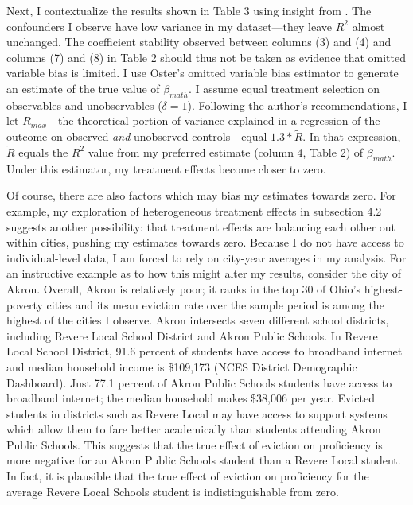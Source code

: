 \documentclass[12pt]{article}
\begin{document}
Next, I contextualize the results shown in Table 3 using insight from \cite{oster_unobservable_2019}. The confounders I observe have low variance in my dataset—they leave $R^2$ almost unchanged. The coefficient stability observed between columns (3) and (4) and columns (7) and (8) in Table 2 should thus not be taken as evidence that omitted variable bias is limited. I use Oster's omitted variable bias estimator to generate an estimate of the true value of $\beta_{math}$. I assume equal treatment selection on observables and unobservables ($\delta = 1$). Following the author's recommendations, I let $R_{max}$—the theoretical portion of  variance explained in a regression of the outcome on observed \textit{and} unobserved controls—equal $1.3 * \tilde{R}$. In that expression, $\tilde{R}$ equals the $R^2$ value from my preferred estimate (column 4, Table 2) of $\beta_{math}$. Under this estimator, my treatment effects become closer to zero. 


Of course, there are also factors which may bias my estimates towards zero. For example, my exploration of heterogeneous treatment effects in subsection 4.2 suggests another possibility: that treatment effects are balancing each other out within cities, pushing my estimates towards zero. Because I do not have access to individual-level data, I am forced to rely on city-year averages in my analysis. For an instructive example as to how this might alter my results, consider the city of Akron. Overall, Akron is relatively poor; it ranks in the top 30 of Ohio's highest-poverty cities and its mean eviction rate over the sample period is among the highest of the cities I observe. Akron intersects seven different school districts, including Revere Local School District and Akron Public Schools. In Revere Local School District, 91.6 percent of students have access to broadband internet and median household income is \$109,173 (NCES District Demographic Dashboard). Just 77.1 percent of Akron Public Schools students have access to broadband internet; the median household makes \$38,006 per year. Evicted students in districts such as Revere Local may have access to support systems which allow them to fare better academically than students attending Akron Public Schools. This suggests that the true effect of eviction on proficiency is more negative for an Akron Public Schools student than a Revere Local student. In fact, it is plausible that the true effect of eviction on proficiency for the average Revere Local Schools student is indistinguishable from zero. 
\end{document}
